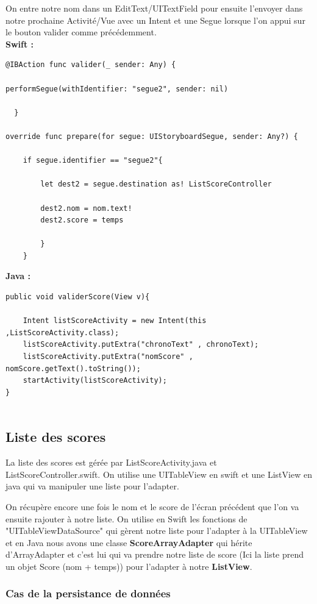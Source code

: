 \documentclass{article}
\begin{document}
On entre notre nom dans un EditText/UITextField pour ensuite l'envoyer dans notre prochaine Activité/Vue avec un Intent et une Segue lorsque l'on appui sur le bouton valider comme précédemment. 
\\
\textbf{Swift :} 
\begin{verbatim}
@IBAction func valider(_ sender: Any) {
        
performSegue(withIdentifier: "segue2", sender: nil)
        
  }
    
override func prepare(for segue: UIStoryboardSegue, sender: Any?) {
        
    if segue.identifier == "segue2"{
            
        let dest2 = segue.destination as! ListScoreController
            
        dest2.nom = nom.text!
        dest2.score = temps
            
        }
    }
\end{verbatim}


\textbf{Java :}
\begin{verbatim}
public void validerScore(View v){

	Intent listScoreActivity = new Intent(this ,ListScoreActivity.class);
    listScoreActivity.putExtra("chronoText" , chronoText);
    listScoreActivity.putExtra("nomScore" , nomScore.getText().toString());
    startActivity(listScoreActivity);
}


\end{verbatim}

\subsection{Liste des scores}

La liste des scores est gérée par ListScoreActivity.java et ListScoreController.swift. On utilise une UITableView en swift et une ListView en java qui va manipuler une liste pour l'adapter. 

On récupère encore une fois le nom et le score de l'écran précédent que l'on va ensuite rajouter à notre liste. On utilise en Swift les fonctions de "UITableViewDataSource" qui gèrent notre liste pour l'adapter à la UITableView et en Java nous avons une classe \textbf{ScoreArrayAdapter } qui hérite d'ArrayAdapter et c'est lui qui va prendre notre liste de score (Ici la liste prend un objet Score (nom + temps)) pour l'adapter à notre \textbf{ListView}.

\subsubsection{Cas de la persistance de données}
\end{document}
